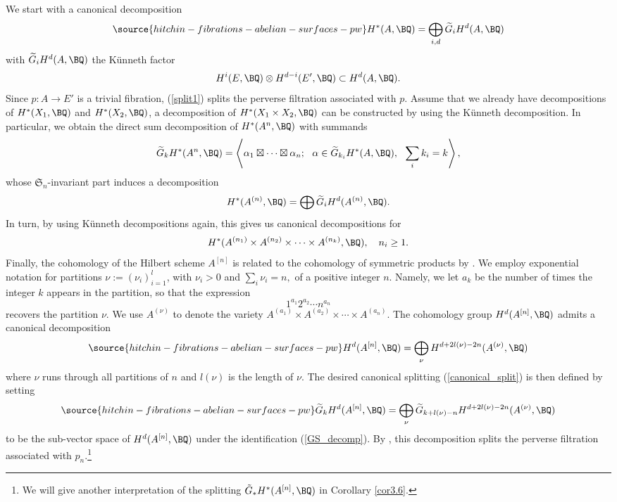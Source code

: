 We start with a canonical decomposition
\begin{equation}\label{split1}
\source{hitchin-fibrations-abelian-surfaces-pw}
    H^*(A, \BQ) = \bigoplus_{i,d} \widetilde{G}_iH^d(A, \BQ)
\end{equation}
with $\widetilde{G}_iH^d(A, \BQ)$ the K\"unneth factor
\[
H^i(E, \BQ) \otimes H^{d-i}(E',\BQ) \subset H^d(A, \BQ).
\]
Since $p: A\to E'$ is a trivial fibration, (\ref{split1}) splits the perverse filtration associated with $p$. Assume that we already have decompositions of $H^*(X_1, \BQ)$ and $H^*(X_2, \BQ)$, a decomposition of $H^\ast(X_1 \times X_2, \BQ)$ can be constructed by using the K\"unneth decomposition. In particular, we obtain the direct sum decomposition of $H^*(A^n, \BQ)$ with summands
\[
\widetilde{G}_kH^*(A^n, \BQ)= \left \langle \alpha_1 \boxtimes \cdots \boxtimes \alpha_n;~~ \alpha \in \widetilde{G}_{k_i}H^*(A, \BQ),~~ \sum_{i} {k_i} = k   \right \rangle,
\]
whose $\mathfrak{S}_n$-invariant part induces a decomposition
\[
H^*(A^{(n)}, \BQ) = \bigoplus \widetilde{G}_iH^d(A^{(n)}, \BQ).
\]
In turn, by using  K\"unneth decompositions again, this gives us  canonical decompositions for
\[
H^\ast(A^{(n_1)}\times A^{(n_2)} \times \cdots \times A^{(n_k)}, \BQ), \quad n_i \geq 1.
\]
Finally, the cohomology of the Hilbert scheme $A^{[n]}$ is related to the cohomology of symmetric products by \cite{Go2,dCM3}.  We employ exponential notation for partitions $\nu:= (\nu_i)_{i=1}^l$, with  $\nu_i >0$ and
$\sum_i \nu_i =n,$ of a positive integer $n$. Namely, we let $a_k$ be the number of times the integer $k$ appears
in the partition, so that the expression
\[
1^{a_1}2^{a_2}\cdots n^{a_n}\]
 recovers the partition $\nu$.
We use $A^{(\nu)}$ to denote the variety $A^{(a_1)} \times A^{(a_2)} \times \cdots \times A^{(a_n)}$. The cohomology group $H^d(A^{[n]}, \BQ)$ admits a canonical decomposition
\begin{equation}\label{GS_decomp}
\source{hitchin-fibrations-abelian-surfaces-pw}
H^d(A^{[n]}, \BQ) = \bigoplus_{\nu} H^{d+2l(\nu)-2n}(A^{(\nu)}, \BQ)
\end{equation}
where $\nu$ runs through all partitions of $n$ and $l(\nu)$ is the length of $\nu$.
The desired canonical splitting (\ref{canonical_split}) is then defined by setting
\begin{equation}\label{cansplitting15}
\source{hitchin-fibrations-abelian-surfaces-pw}
\widetilde{G}_kH^d(A^{[n]}, \BQ) = \bigoplus_{\nu} \widetilde{G}_{k+l(\nu)-n}H^{d+2l(\nu)-2n}(A^{(\nu)}, \BQ)
\end{equation}
to be the sub-vector space of $H^d(A^{[n]}, \BQ)$ under the identification (\ref{GS_decomp}). By \cite[Proposition 4.12]{Z}, this decomposition splits the perverse filtration associated with $p_n$.\footnote{We will give another interpretation of the splitting $\tilde{G}_*H^*(A^{[n]},\BQ)$ in Corollary \ref{cor3.6}.}

